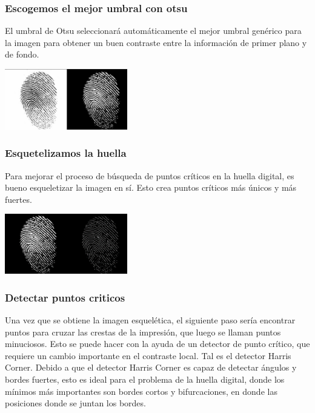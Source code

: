 \documentclass[preprint,12pt]{elsarticle}
\begin{document}
\begin{multicols}{2}
	\subsubsection{Escogemos el mejor umbral con otsu} 
El umbral de Otsu seleccionará automáticamente el mejor umbral genérico para la imagen para obtener un buen contraste entre la información de primer plano y de fondo. \\

{\includegraphics[width=0.4\textwidth]{./IMAGENES/otsu}\par}

	\subsubsection{Esquetelizamos la huella} 
Para mejorar el proceso de búsqueda de puntos críticos en la huella digital, es bueno esqueletizar la imagen en sí. Esto crea puntos críticos más únicos y más fuertes.\\

{\includegraphics[width=0.4\textwidth]{./IMAGENES/esqueleto}\par}

	\subsubsection{Detectar puntos criticos}
Una vez que se obtiene la imagen esquelética, el siguiente paso sería encontrar puntos para cruzar las crestas de la impresión, que luego se llaman puntos minuciosos. Esto se puede hacer con la ayuda de un detector de punto crítico, que requiere un cambio importante en el contraste local. Tal es el detector Harris Corner. Debido a que el detector Harris Corner es capaz de detectar ángulos y bordes fuertes, esto es ideal para el problema de la huella digital, donde los mínimos más importantes son bordes cortos y bifurcaciones, en donde las posiciones donde se juntan los bordes.  \\


\end{multicols}
\end{document}
